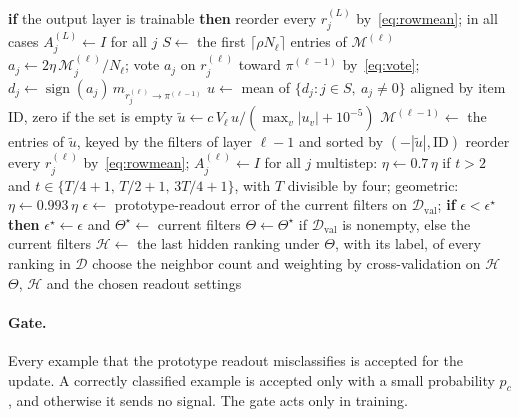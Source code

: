 \begin{algorithm}[!htbp]
\begin{algorithmic}[1]
  \EndFor
  \State \textbf{if} the output layer is trainable \textbf{then} reorder every $r^{(L)}_j$ by~\eqref{eq:rowmean}; in all cases $A^{(L)}_j\gets I$ for all $j$
   
      \State $S\gets$ the first $\lceil\rho N_\ell\rceil$ entries of $\mathcal{M}^{(\ell)}$ 
       
        \State $a_j\gets2\eta\,\mathcal{M}^{(\ell)}_j/N_\ell$; vote $a_j$ on $r^{(\ell)}_j$ toward $\pi^{(\ell-1)}$ by~\eqref{eq:vote}; $d_j\gets\operatorname{sign}(a_j)\,m_{r^{(\ell)}_j\to\pi^{(\ell-1)}}$
      \EndFor
        \State $u\gets$ mean of $\{d_j : j\in S,\ a_j\ne0\}$ aligned by item ID, zero if the set is empty
        \State $\tilde u\gets c\,V_\ell\,u/(\max_v|u_v|+10^{-5})$ 
        \State $\mathcal{M}^{(\ell-1)}\gets$ the entries of $\tilde u$, keyed by the filters of layer $\ell-1$ and sorted by $(-|\tilde u|,\mathrm{ID})$
      \EndIf
    \EndFor
    \State reorder every $r^{(\ell)}_j$ by~\eqref{eq:rowmean}; $A^{(\ell)}_j\gets I$ for all $j$ 
  \EndFor
  \State \label{alg:line-schedule}multistep: $\eta\gets0.7\,\eta$ if $t>2$ and $t\in\{T/4+1,\,T/2+1,\,3T/4+1\}$, with $T$ divisible by four; geometric: $\eta\gets0.993\,\eta$ 
   
    \State $\epsilon\gets$ prototype-readout error of the current filters on $\mathcal{D}_{\mathrm{val}}$; \textbf{if} $\epsilon<\epsilon^\star$ \textbf{then} $\epsilon^\star\gets\epsilon$ and $\Theta^\star\gets$ current filters
  \EndIf
\EndFor
\State $\Theta\gets\Theta^\star$ if $\mathcal{D}_{\mathrm{val}}$ is nonempty, else the current filters
\State $\mathcal{H}\gets$ the last hidden ranking under $\Theta$, with its label, of every ranking in $\mathcal{D}$ 
\State choose the neighbor count and weighting by cross-validation on $\mathcal{H}$ 
\State \Return $\Theta$, $\mathcal{H}$ and the chosen readout settings
\end{algorithmic}
\end{algorithm}

\paragraph{Gate.} Every example that the prototype readout misclassifies is accepted for the update. A correctly classified example is accepted only with a small probability $p_c$, and otherwise it sends no signal. The gate acts only in training.

